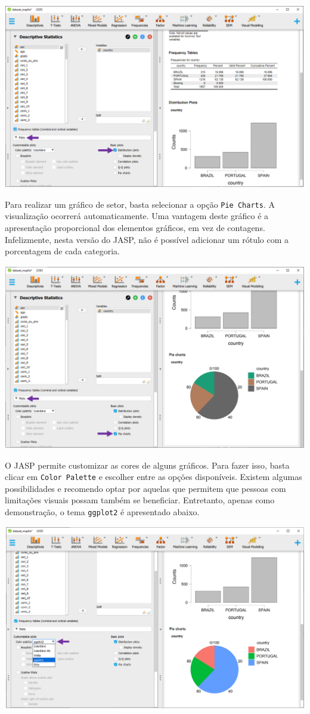 \documentclass[
]{book}
\begin{document}
\includegraphics{./img/cap_desc_jasp_grafico_barras.png}

Para realizar um gráfico de setor, basta selecionar a opção
\texttt{Pie\ Charts}. A visualização ocorrerá automaticamente. Uma
vantagem deste gráfico é a apresentação proporcional dos elementos
gráficos, em vez de contagens. Infelizmente, nesta versão do JASP, não é
possível adicionar um rótulo com a porcentagem de cada categoria.

\includegraphics{./img/cap_desc_jasp_grafico_setor.png}

O JASP permite customizar as cores de alguns gráficos. Para fazer isso,
basta clicar em \texttt{Color\ Palette} e escolher entre as opções
disponíveis. Existem algumas possibilidades e recomendo optar por
aquelas que permitem que pessoas com limitações visuais possam também se
beneficiar. Entretanto, apenas como demonstração, o tema
\texttt{ggplot2} é apresentado abaixo.

\includegraphics{./img/cap_desc_jasp_grafico_setor2.png}
\end{document}
